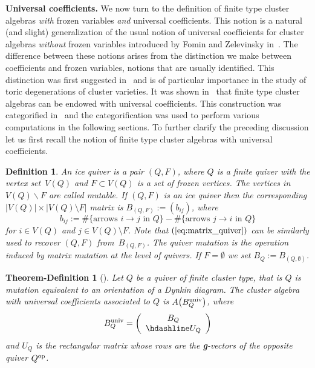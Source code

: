 \documentclass[10pt,a4paper]{amsart}
\newcommand{\thlabel}[1]{\label{#1}}
\newtheorem{Theorem-Definition}[Theorem]{Theorem-Definition}
\newtheorem{Definition}[Theorem]{Definition}
\numberwithin{equation}{section}
\begin{document}
\noindent
{\bf Universal coefficients.} We now turn to the definition of finite type cluster algebras \emph{with} frozen variables \emph{and} universal coefficients.
This notion is a natural (and slight) generalization of the usual notion of universal coefficients for cluster algebras \emph{without} frozen variables introduced by Fomin and Zelevinsky in~\cite[Section~12]{FZ_clustersIV}.
The difference between these notions arises from the distinction we make between coefficients and frozen variables, notions that are usually identified.
This distinction was first suggested in~\cite{BFMN} and is of particular importance in the study of toric degenerations of cluster varieties.
It was shown in~\cite{FZ_clustersIV} that finite type cluster algebras can be endowed with universal coefficients. This construction was categorified in~\cite{NC_univ} and the categorification was used to perform various computations in the following sections.
To further clarify the preceding discussion let us first recall the notion of finite type cluster algebras with universal coefficients.

\begin{Definition}\thlabel{ice quiver/matrix}
An {\it ice quiver} is a pair $(Q,F)$, where $Q$ is a finite quiver with the vertex set~$V(Q)$ and $F\subset V(Q)$ is a set of {\it frozen vertices}.
The vertices in $V(Q)\backslash F$ are called {\it mutable}.
If $(Q,F)$ is an ice quiver then the corresponding $|V(Q)|\times |V(Q)\setminus F|$ matrix is $B_{(Q,F)}:=(b_{ij})$, where
\begin{equation}
\label{eq:matrix_quiver}
b_{ij}:= \#\{ \text{arrows } i \to j \text{ in }Q\} - \#\{ \text{arrows } j \to i \text{ in }Q\}
\end{equation}
for $i\in V(Q)$ and $j\in V(Q)\setminus F$. Note that $(\ref{eq:matrix_quiver})$ can be similarly used to recover $(Q,F)$ from~$B_{(Q,F)}$. The {\it quiver mutation} is the operation induced by matrix mutation at the level of quivers.
If $F=\emptyset$ we set $B_{Q}:=B_{(Q,\emptyset)}$.
\end{Definition}
\begin{Theorem-Definition}[{\cite[Corollary 8.15]{Reading}}]
\thlabel{def:univ_coeff_R}
Let $Q$ be a quiver of finite cluster type, that is $Q$ is mutation equivalent to an orientation of a Dynkin diagram.
The {\it cluster algebra with universal coefficients} associated to $Q$ is $A\big(B_Q^{{\rm univ}}\big)$, where
\begin{displaymath}
B^{{\rm univ}}_Q=
\left(
\begin{array}{c}
 B_Q \\ \hdashline
 U_Q
\end{array}
\right)
\end{displaymath}
and $U_Q$ is the rectangular matrix whose rows are the {\bf g}-vectors of the opposite quiver $Q^{\rm op}$.
\end{Theorem-Definition}
\end{document}
